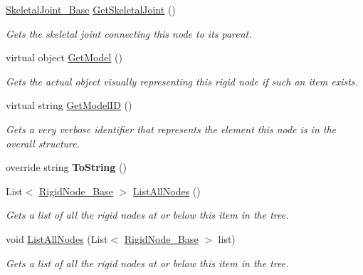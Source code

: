 \begin{DoxyCompactItemize}
\hyperlink{class_skeletal_joint___base}{Skeletal\+Joint\+\_\+\+Base} \hyperlink{class_rigid_node___base_a6f26d5cf2ff78a2066913e81df473abf}{Get\+Skeletal\+Joint} ()
\begin{DoxyCompactList}\small\item\em Gets the skeletal joint connecting this node to its parent. \end{DoxyCompactList}\item 
virtual object \hyperlink{class_rigid_node___base_a68abee405ea4eb8185ec902791e085eb}{Get\+Model} ()
\begin{DoxyCompactList}\small\item\em Gets the actual object visually representing this rigid node if such an item exists. \end{DoxyCompactList}\item 
virtual string \hyperlink{class_rigid_node___base_a98a362b9ae0cf05e4c1f9db70bcf89c5}{Get\+Model\+ID} ()
\begin{DoxyCompactList}\small\item\em Gets a very verbose identifier that represents the element this node is in the overall structure. \end{DoxyCompactList}\item 
\mbox{\label{class_rigid_node___base_afed92596ab670fc6cbbb67cb533cd180}} 
override string {\bfseries To\+String} ()
\item 
List$<$ \hyperlink{class_rigid_node___base}{Rigid\+Node\+\_\+\+Base} $>$ \hyperlink{class_rigid_node___base_aebef38e79a3b7a54dd769db5c6ae6a40}{List\+All\+Nodes} ()
\begin{DoxyCompactList}\small\item\em Gets a list of all the rigid nodes at or below this item in the tree. \end{DoxyCompactList}\item 
void \hyperlink{class_rigid_node___base_aef149d0976f10b042ee989c9854b441f}{List\+All\+Nodes} (List$<$ \hyperlink{class_rigid_node___base}{Rigid\+Node\+\_\+\+Base} $>$ list)
\begin{DoxyCompactList}\small\item\em Gets a list of all the rigid nodes at or below this item in the tree. \end{DoxyCompactList}\end{DoxyCompactItemize}
